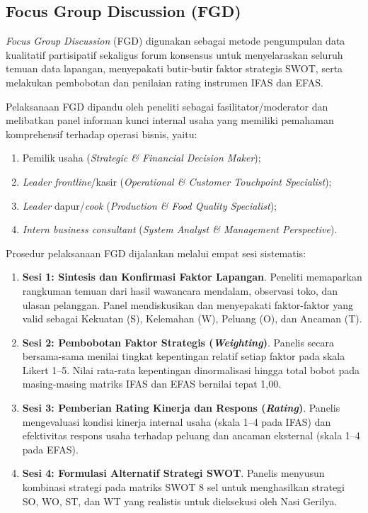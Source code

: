 \subsection{Focus Group Discussion (FGD)}
\textit{Focus Group Discussion} (FGD) digunakan sebagai metode pengumpulan data kualitatif partisipatif sekaligus forum konsensus untuk menyelaraskan seluruh temuan data lapangan, menyepakati butir-butir faktor strategis SWOT, serta melakukan pembobotan dan penilaian rating instrumen IFAS dan EFAS. 

Pelaksanaan FGD dipandu oleh peneliti sebagai fasilitator/moderator dan melibatkan panel informan kunci internal usaha yang memiliki pemahaman komprehensif terhadap operasi bisnis, yaitu:
\begin{enumerate}
    \item Pemilik usaha (\textit{Strategic \& Financial Decision Maker});
    \item \textit{Leader frontline}/kasir (\textit{Operational \& Customer Touchpoint Specialist});
    \item \textit{Leader} dapur/\textit{cook} (\textit{Production \& Food Quality Specialist});
    \item \textit{Intern business consultant} (\textit{System Analyst \& Management Perspective}).
\end{enumerate}

Prosedur pelaksanaan FGD dijalankan melalui empat sesi sistematis:
\begin{enumerate}
    \item \textbf{Sesi 1: Sintesis dan Konfirmasi Faktor Lapangan}. Peneliti memaparkan rangkuman temuan dari hasil wawancara mendalam, observasi toko, dan ulasan pelanggan. Panel mendiskusikan dan menyepakati faktor-faktor yang valid sebagai Kekuatan (S), Kelemahan (W), Peluang (O), dan Ancaman (T).
    \item \textbf{Sesi 2: Pembobotan Faktor Strategis (\textit{Weighting})}. Panelis secara bersama-sama menilai tingkat kepentingan relatif setiap faktor pada skala Likert 1--5. Nilai rata-rata kepentingan dinormalisasi hingga total bobot pada masing-masing matriks IFAS dan EFAS bernilai tepat 1,00.
    \item \textbf{Sesi 3: Pemberian Rating Kinerja dan Respons (\textit{Rating})}. Panelis mengevaluasi kondisi kinerja internal usaha (skala 1--4 pada IFAS) dan efektivitas respons usaha terhadap peluang dan ancaman eksternal (skala 1--4 pada EFAS).
    \item \textbf{Sesi 4: Formulasi Alternatif Strategi SWOT}. Panelis menyusun kombinasi strategi pada matriks SWOT 8 sel untuk menghasilkan strategi SO, WO, ST, dan WT yang realistis untuk dieksekusi oleh Nasi Gerilya.
\end{enumerate}

